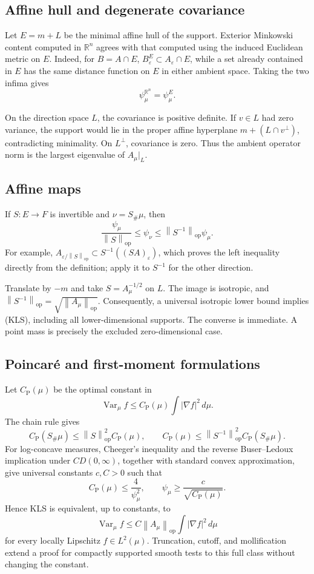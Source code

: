 \documentclass[11pt]{article}
\theoremstyle{definition}
\theoremstyle{remark}
\newcommand{\R}{\mathbb R}
\newcommand{\Var}{\operatorname{Var}}
\newcommand{\op}{\mathrm{op}}
\newcommand{\1}{\mathbf 1}
\newcommand{\CP}{C_{\mathrm P}}
\newcommand{\dd}{\,d}
\newcommand{\norm}[1]{\left\lVert #1\right\rVert}
\begin{document}
\subsection{Affine hull and degenerate covariance}

Let \(E=m+L\) be the minimal affine hull of the support.  Exterior
Minkowski content computed in \(\R^n\) agrees with that computed using the
induced Euclidean metric on \(E\).  Indeed, for \(B=A\cap E\),
\(B_\varepsilon^E\subset A_\varepsilon\cap E\), while a set already
contained in \(E\) has the same distance function on \(E\) in either
ambient space.  Taking the two infima gives
\[
                         \psi_\mu^{\R^n}=\psi_\mu^E.  \tag{2.1}
\]

On the direction space \(L\), the covariance is positive definite.  If
\(v\in L\) had zero variance, the support would lie in the proper affine
hyperplane \(m+(L\cap v^\perp)\), contradicting minimality.  On
\(L^\perp\), covariance is zero.  Thus the ambient operator norm is the
largest eigenvalue of \(A_\mu|_L\).

\subsection{Affine maps}

If \(S:E\to F\) is invertible and \(\nu=S_\#\mu\), then
\[
 \frac{\psi_\mu}{\norm S_{\op}}
 \le \psi_\nu
 \le \norm{S^{-1}}_{\op}\psi_\mu.                  \tag{2.2}
\]
For example,
\(A_{\varepsilon/\norm S_{\op}}\subset
S^{-1}((SA)_\varepsilon)\), which proves the left inequality directly
from the definition; apply it to \(S^{-1}\) for the other direction.

Translate by \(-m\) and take \(S=A_\mu^{-1/2}\) on \(L\).  The image is
isotropic, and \(\norm{S^{-1}}_{\op}=\sqrt{\norm{A_\mu}_{\op}}\).
Consequently, a universal isotropic lower bound implies (KLS), including
all lower-dimensional supports.  The converse is immediate.  A point mass
is precisely the excluded zero-dimensional case.

\subsection{Poincar\'e and first-moment formulations}

Let \(\CP(\mu)\) be the optimal constant in
\[
 \Var_\mu f\le \CP(\mu)\int|\nabla f|^2\dd\mu.       \tag{2.3}
\]
The chain rule gives
\[
 \CP(S_\#\mu)\le\norm S_{\op}^2\CP(\mu),\qquad
 \CP(\mu)\le\norm{S^{-1}}_{\op}^2\CP(S_\#\mu).    \tag{2.4}
\]
For log-concave measures, Cheeger's inequality and the reverse
Buser--Ledoux implication under \(CD(0,\infty)\), together with standard
convex approximation, give universal constants \(c,C>0\) such that
\[
 \CP(\mu)\le \frac{4}{\psi_\mu^2},
 \qquad
 \psi_\mu\ge\frac{c}{\sqrt{\CP(\mu)}}.              \tag{2.5}
\]
Hence KLS is equivalent, up to constants, to
\[
 \boxed{\quad
 \Var_\mu f\le C\norm{A_\mu}_{\op}
 \int|\nabla f|^2\dd\mu
 \quad}                                               \tag{P}
\]
for every locally Lipschitz \(f\in L^2(\mu)\).  Truncation, cutoff, and
mollification extend a proof for compactly supported smooth tests to this
full class without changing the constant.
\end{document}
